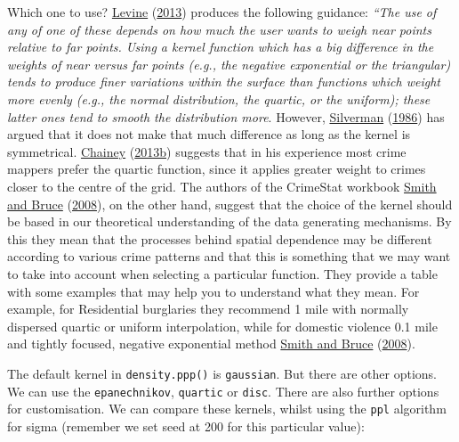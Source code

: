 \documentclass[
  krantz2]{krantz}
\begin{document}
Which one to use? \protect\hyperlink{ref-Levine_2013}{Levine} (\protect\hyperlink{ref-Levine_2013}{2013}) produces the following guidance: \emph{``The use of any of one of these depends on how much the user wants to weigh near points relative to far points. Using a kernel function which has a big difference in the weights of near versus far points (e.g., the negative exponential or the triangular) tends to produce finer variations within the surface than functions which weight more evenly (e.g., the normal distribution, the quartic, or the uniform); these latter ones tend to smooth the distribution more}. However, \protect\hyperlink{ref-Silverman_1986}{Silverman} (\protect\hyperlink{ref-Silverman_1986}{1986}) has argued that it does not make that much difference as long as the kernel is symmetrical. \protect\hyperlink{ref-Chainey_2013b}{Chainey} (\protect\hyperlink{ref-Chainey_2013b}{2013b}) suggests that in his experience most crime mappers prefer the quartic function, since it applies greater weight to crimes closer to the centre of the grid. The authors of the CrimeStat workbook \protect\hyperlink{ref-Smith_2008}{Smith and Bruce} (\protect\hyperlink{ref-Smith_2008}{2008}), on the other hand, suggest that the choice of the kernel should be based in our theoretical understanding of the data generating mechanisms. By this they mean that the processes behind spatial dependence may be different according to various crime patterns and that this is something that we may want to take into account when selecting a particular function. They provide a table with some examples that may help you to understand what they mean. For example, for Residential burglaries they recommend 1 mile with normally dispersed quartic or uniform interpolation, while for domestic violence 0.1 mile and tightly focused, negative exponential method \protect\hyperlink{ref-Smith_2008}{Smith and Bruce} (\protect\hyperlink{ref-Smith_2008}{2008}).

The default kernel in \texttt{density.ppp()} is \texttt{gaussian}. But there are other options. We can use the \texttt{epanechnikov}, \texttt{quartic} or \texttt{disc}. There are also further options for customisation. We can compare these kernels, whilst using the \texttt{ppl} algorithm for sigma (remember we set seed at 200 for this particular value):
\end{document}
